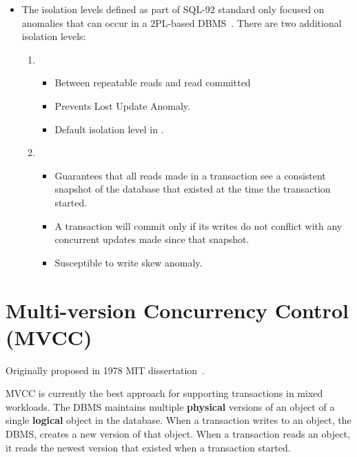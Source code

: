 \documentclass[11pt]{article}
\begin{document}
\begin{itemize}
    \item
    The isolation levels defined as part of SQL-92 standard only focused on anomalies that can 
    occur in a 2PL-based DBMS~\cite{p1-berenson}. There are two additional isolation levels:
    \begin{enumerate}
        \item {}
        \begin{itemize}
            \item Between repeatable reads and read committed
            \item Prevents Lost Update Anomaly.
            \item Default isolation level in .
        \end{itemize}
        
        \item {}
        \begin{itemize}
            \item
            Guarantees that all reads made in a transaction see a consistent snapshot of the 
            database that existed at the time the transaction started.
            
            \item
            A transaction will commit only if its writes do not conflict with any concurrent 
            updates made since that snapshot.
            
            \item
            Susceptible to write skew anomaly.
        \end{itemize}
    \end{enumerate}
\end{itemize}

\section{Multi-version Concurrency Control (MVCC)}
Originally proposed in 1978 MIT dissertation~\cite{reed1978naming}.

MVCC is currently the best approach for supporting transactions in mixed workloads.
The DBMS maintains multiple \textbf{physical} versions of an object of a single 
\textbf{logical} object in the database. 
When a transaction writes to an object, the DBMS, creates a new version of that object.
When a transaction reads an object, it reads the newest version that existed when a 
transaction started.
    
\end{document}
